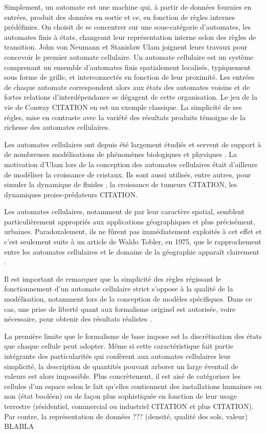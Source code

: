 \documentclass[10pt,twocolumn]{article}
\begin{document}
Simplement, un automate est une machine qui, à partir de données
fournies en entrées, produit des données en sortie et ce, en fonction
de règles internes prédéfinies. On choisit de se concentrer sur une
sous-catégorie d'automates, les automates finis à états, changeant
leur représentation interne selon des règles de transition. John von
Neumann et Stanislaw Ulam joignent leurs travaux pour concevoir le
premier automate cellulaire. Un automate cellulaire est un système
comprenant un ensemble d'automates finis spatialement localisés,
typiquement sous forme de grille, et interconnectés en fonction de
leur proximité. Les entrées de chaque automate correspondent alors aux
états des automates voisins et de fortes relations d'interdépendance
se dégagent de cette organisation. Le jeu de la vie de Conway CITATION
en est un exemple classique. La simplicité de ses règles, mise en
contraste avec la variété des résultats produits témoigne de la
richesse des automates cellulaires.

Les automates cellulaires ont depuis été largement étudiés et servent
de support à de nombreuses modélisations de phénomènes biologiques et
physiques \cite{Ganguly}. La motivation d'Ulam lors de la conception
des automates cellulaires était d'ailleurs de modéliser la croissance
de cristaux. Ils sont aussi utilisés, entre autres, pour simuler la
dynamique de fluides \cite{Frisch1986}, la croissance de tumeurs
CITATION, les dynamiques proies-prédateurs CITATION.

Les automates cellulaires, notamment de par leur caractère spatial,
semblent particulièrement appropriés aux applications géographiques et
plus précisément, urbaines. Paradoxalement, ils ne fûrent pas
immédiatement exploités à cet effet et c'est seulement suite à un
article de Waldo Tobler, en 1975, que le rapprochement entre les
automates cellulaires et le domaine de la géographie apparaît
clairement \cite{Tobler1975}.

Il est important de remarquer que la simplicité des règles régissant
le fonctionnement d'un automate cellulaire strict s'oppose à la
qualité de la modélisation, notamment lors de la conception de modèles
spécifiques. Dans ce cas, une prise de liberté quant aux formalisme
originel est autorisée, voire nécessaire, pour obtenir des résultats
réalistes \cite{White1998}.

La première limite que le formalisme de base impose est la
discrétisation des états que chaque cellule peut adopter. Même si
cette caractéristique fait partie intégrante des particularités qui
confèrent aux automates cellulaires leur simplicité, la description de
quantités pouvant arborer un large éventail de valeurs est alors
impossible. Plus concrètement, il est aisé de catégoriser les cellules
d'un espace selon le fait qu'elles contiennent des installations
humaines ou non (état booléen) ou de façon plus sophistiquée en
fonction de leur usage terrestre (résidentiel, commercial ou
industriel CITATION et plus CITATION). Par contre, la représentation
de données ??? (densité, qualité des sols, valeur) BLABLA
\end{document}
